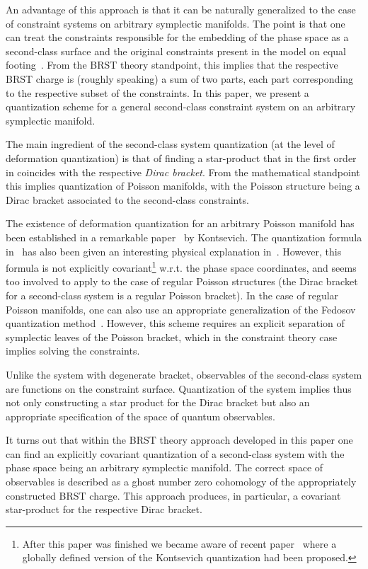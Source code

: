 \documentclass[a4paper,11pt]{amsart}
\numberwithin{thm}{section} %
\numberwithin{equation}{section} %
\numberwithin{figure}{section} %
\renewcommand{\:}{{\rm\, :\,}}
\begin{document}
An advantage of this approach is that it can be naturally generalized
to the case of constraint systems on arbitrary symplectic manifolds.
The point is that one can treat the constraints responsible for the
embedding of the phase space as a second-class surface and the
original constraints present in the model on equal
footing~\cite{[BFF]}.  {}From the BRST theory standpoint, this implies
that the respective BRST charge is (roughly speaking) a sum of two
parts, each part corresponding to the respective subset of the
constraints.  In this paper, we present a quantization scheme for a
general second-class constraint system on an arbitrary symplectic
manifold.


The main ingredient of the second-class system quantization (at the
level of deformation quantization) is that of finding a star-product
that in the first order in \myHighlight{$\hbar$}\coordHE{} coincides with the respective
\textit{Dirac bracket}.  {}From the mathematical standpoint this
implies quantization of Poisson manifolds, with the Poisson structure
being a Dirac bracket associated to the second-class constraints.

The existence of deformation quantization for an arbitrary Poisson
manifold has been established in a remarkable
paper~\cite{[Kontsevich]} by Kontsevich. The quantization formula
in~\cite{[Kontsevich]} has also been given an interesting physical
explanation in~\cite{[CF]}.  However, this formula is not explicitly
covariant\footnote{After this paper was finished we became aware of
  recent paper~\cite{[CFT]} where a globally defined version of the
  Kontsevich quantization had been proposed.} w.r.t. the phase space
coordinates, and seems too involved to apply to the case of regular
Poisson structures (the Dirac bracket for a second-class system is a
regular Poisson bracket).  In the case of regular Poisson manifolds,
one can also use an appropriate generalization of the Fedosov
quantization method~\cite{[Fedosov-book]}.  However, this scheme
requires an explicit separation of symplectic leaves of the Poisson
bracket, which in the constraint theory case implies solving the
constraints.

Unlike the system with degenerate bracket, observables
of the second-class system are functions on the constraint
surface.  Quantization of the system implies thus not only constructing
a star product for the Dirac bracket but also an appropriate
specification of the space of quantum observables.


It turns out that within the BRST theory approach
developed in this paper one can find an explicitly covariant
quantization of a second-class system with the phase space being
an arbitrary symplectic manifold.  The correct space of observables is
described as a ghost number zero cohomology of the appropriately
constructed BRST charge.  This approach produces, in particular, a
covariant star-product for the respective Dirac bracket.
\end{document}
